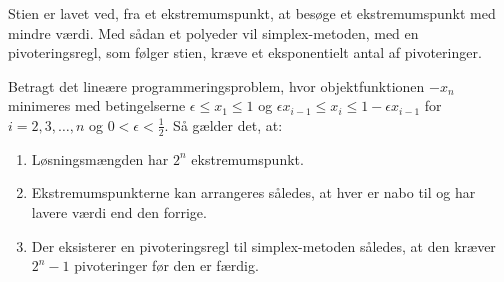 Stien er lavet ved, fra et ekstremumspunkt, at besøge et ekstremumspunkt med mindre værdi.
Med sådan et polyeder vil simplex-metoden, med en pivoteringsregl, som følger stien, kræve et eksponentielt antal af pivoteringer.
%
\begin{thm}{}{}
Betragt det lineære programmeringsproblem, hvor objektfunktionen $-x_n$ minimeres med betingelserne $\epsilon \leq x_1 \leq 1$ og $\epsilon x_{i-1} \leq x_i \leq 1 - \epsilon x_{i-1}$ for $i = 2, 3, \ldots, n$ og $0 < \epsilon < \frac{1}{2}$.
Så gælder det, at:
%
\begin{enumerate}[label=(\alph*)]
\item Løsningsmængden har $2^n$ ekstremumspunkt.
\item Ekstremumspunkterne kan arrangeres således, at hver er nabo til og har lavere værdi end den forrige.
\item Der eksisterer en pivoteringsregl til simplex-metoden således, at den kræver $2^n-1$ pivoteringer før den er færdig.
\end{enumerate}
%
\end{thm}
%
